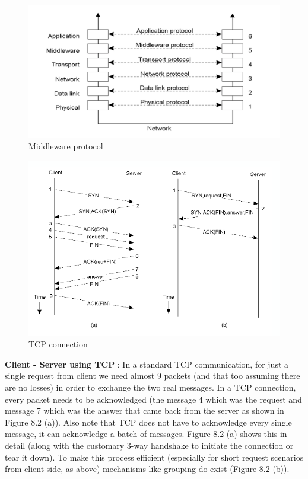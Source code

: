\documentclass[twoside]{article}
\begin{document}
\begin{description}
\begin{figure}[h]
\centering
\includegraphics[scale=0.5]{layers.png}
\caption{Middleware protocol}
\end{figure}
\begin{figure}[h]
\centering
\includegraphics[scale=0.75]{client_server_tcp.png}
\caption{TCP connection}
\end{figure}
\item{\textbf{Client - Server using TCP}} : In a standard TCP communication, for just a single request from client we need almost 9 packets (and that too assuming there are no losses) in order to exchange the two real messages. In a TCP connection, every packet needs to be acknowledged (the message 4 which was the request and message 7 which was the answer that came back from the server as shown in Figure 8.2 (a)). Also note that TCP does not have to acknowledge every single message, it can acknowledge a batch of messages. Figure 8.2 (a) shows this in detail (along with the customary 3-way handshake to initiate the connection or tear it down). To make this process efficient (especially for short request scenarios from client side, as above) mechanisms like grouping do exist (Figure 8.2 (b)).

\end{description}
\end{document}
